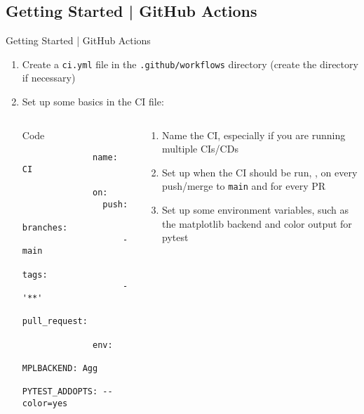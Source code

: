 \subsection{Getting Started | GitHub Actions}
\begin{frame}[fragile]{
    Getting Started | GitHub Actions
    \hfill
  }
  \begin{enumerate}
    \item Create a \texttt{ci.yml} file in the \texttt{.github/workflows}
        directory (create the directory if necessary)
    \item Set up some basics in the CI file:
      \begin{columns}[t, onlytextwidth]
        \begin{column}{0.52\textwidth}
          \begin{block}{Code}
            \footnotesize
            \begin{verbatim}
              name: CI

              on:
                push:
                  branches:
                    - main
                  tags:
                    - '**'
                pull_request:

              env:
                MPLBACKEND: Agg
                PYTEST_ADDOPTS: --color=yes
            \end{verbatim}
          \end{block}
        \end{column}
        \begin{column}{0.44\textwidth}
          \pause
          \begin{enumerate}
            \setlength{\itemsep}{1em}
            \item <2-> Name the CI, especially if you are running multiple CIs/CDs
            \item <3-> Set up when the CI should be run, \eg, on every push/merge to \texttt{main}
              and for every PR
            \item <4-> Set up some environment variables, such as the matplotlib backend and color output for pytest
          \end{enumerate}
        \end{column}
      \end{columns}
  \end{enumerate}
\end{frame}

